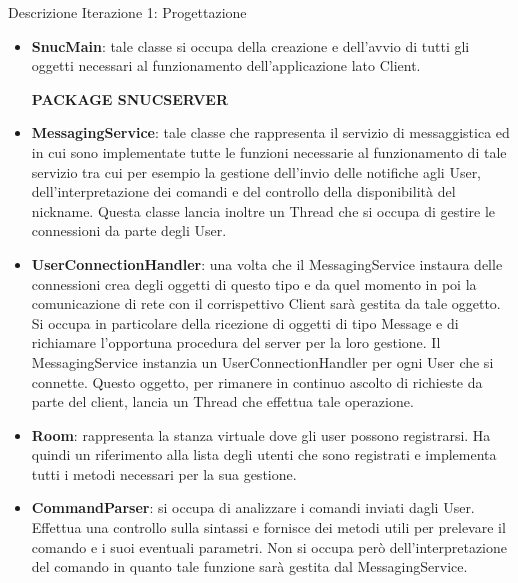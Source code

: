 \begin{frame} [allowframebreaks] {Descrizione Iterazione 1: Progettazione}
\begin{itemize}
         la gestione di tale messaggio. Poiché dovrà effettuare la continua ricezione di messaggi è stato necessario lanciare un nuovo Thread che resterà in ascolto 
         per ricevere eventuali messaggi da parte del server.
   \item \textbf{SnucMain}: tale classe si occupa della creazione e dell'avvio di tutti gli oggetti necessari al funzionamento dell'applicazione lato Client.
   \newline
   \centerline{\textbf{PACKAGE SNUCSERVER}}
   \item \textbf{MessagingService}: tale classe che rappresenta il servizio di messaggistica ed in cui sono implementate tutte le funzioni necessarie al 
         funzionamento di tale servizio tra cui per esempio la gestione dell'invio delle notifiche agli User, dell'interpretazione dei comandi e del controllo della 
         disponibilità del nickname. Questa classe lancia inoltre un Thread che si occupa di gestire le connessioni da parte degli User.
   \item \textbf{UserConnectionHandler}: una volta che il MessagingService instaura delle connessioni crea degli oggetti di questo tipo e da quel momento in poi la 
         comunicazione di rete con il corrispettivo Client sarà gestita da tale oggetto. Si occupa in particolare della ricezione di oggetti di tipo Message e di 
         richiamare l'opportuna procedura del server per la loro gestione. Il MessagingService instanzia un UserConnectionHandler per ogni User che si connette. 
         Questo oggetto, per rimanere in continuo ascolto di richieste da parte del client, lancia un Thread che effettua tale operazione.
   \item \textbf{Room}: rappresenta la stanza virtuale dove gli user possono registrarsi. Ha quindi un riferimento alla lista degli utenti che sono registrati e 
         implementa tutti i metodi necessari per la sua gestione.
   \item \textbf{CommandParser}: si occupa di analizzare i comandi inviati dagli User. Effettua una controllo sulla sintassi e fornisce dei metodi utili per 
         prelevare il comando e i suoi eventuali parametri. Non si occupa però dell'interpretazione del comando in quanto tale funzione sarà gestita dal 
         MessagingService. 
  \end{itemize} 
\end{frame}

